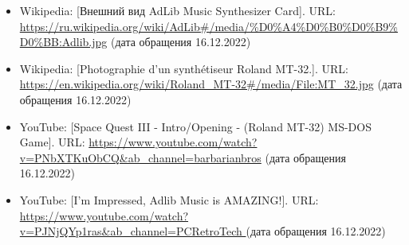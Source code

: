 \documentclass[a4paper,12pt]{extarticle}
\begin{document}
\begin{enumerate}[label=\textbf{\arabic*}]
\begin{itemize}
            \item Wikipedia: [Внешний вид AdLib Music Synthesizer Card]. URL: \url{https://ru.wikipedia.org/wiki/AdLib#/media/%D0%A4%D0%B0%D0%B9%D0%BB:Adlib.jpg} (дата обращения 16.12.2022)
            \item Wikipedia: [Photographie d'un synthétiseur Roland MT-32.]. URL: \url{https://en.wikipedia.org/wiki/Roland_MT-32#/media/File:MT_32.jpg} (дата обращения 16.12.2022)
            \item YouTube: [Space Quest III - Intro/Opening - (Roland MT-32) MS-DOS Game]. URL: \url{https://www.youtube.com/watch?v=PNbXTKuObCQ&ab_channel=barbarianbros} (дата обращения 16.12.2022)
            \item YouTube: [I'm Impressed, Adlib Music is AMAZING!]. URL: \url{https://www.youtube.com/watch?v=PJNjQYp1ras&ab_channel=PCRetroTech
	} (дата обращения 16.12.2022)

        \end{itemize}
    \end{enumerate}
\end{document}
